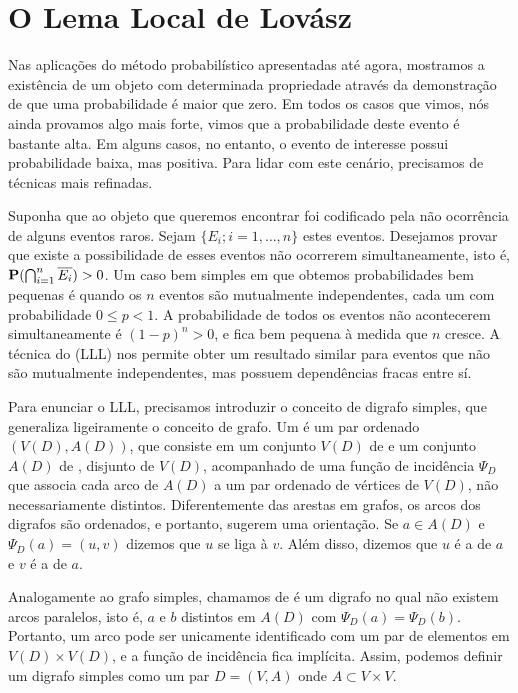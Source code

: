 
\section{O Lema Local de Lovász}


Nas aplicações do método probabilístico apresentadas até agora, mostramos a existência de um objeto com determinada propriedade através da demonstração de que uma probabilidade é maior que zero. Em todos os casos que vimos, nós ainda provamos algo mais forte, vimos que a probabilidade deste evento é bastante alta. Em alguns casos, no entanto, o evento de interesse possui probabilidade baixa, mas positiva. Para lidar com este cenário, precisamos de técnicas mais refinadas.

Suponha que ao objeto que queremos encontrar foi codificado pela não ocorrência de alguns eventos raros. Sejam $\{E_i; i = 1,\dots,n\}$ estes eventos. Desejamos provar que existe a possibilidade de esses eventos não ocorrerem simultaneamente, isto é,  $\operatorname{\mathbf{P}}(\bigcap_{i=1}^n \overline{E_i}) > 0$. Um caso bem simples em que obtemos probabilidades bem pequenas é quando os $n$ eventos são mutualmente independentes, cada um com probabilidade $0 \leq p<1$. A probabilidade de todos os eventos não acontecerem simultaneamente é $(1-p)^n > 0$, e fica bem pequena à medida que $n$ cresce. A técnica do  (LLL) nos permite obter um resultado similar para eventos que não são mutualmente independentes, mas possuem dependências fracas entre sí.

Para enunciar o LLL, precisamos introduzir o conceito de digrafo simples, que generaliza ligeiramente o conceito de grafo. Um  é um par ordenado $(V(D), A(D))$, que consiste em um conjunto $V(D)$ de  e um conjunto $A(D)$ de , disjunto de $V(D)$, acompanhado de uma função de incidência $\Psi_D$ que associa cada arco de $A(D)$ a um par ordenado de vértices de $V(D)$, não necessariamente distintos. Diferentemente das arestas em grafos, os arcos dos digrafos são ordenados, e portanto, sugerem uma orientação. Se $a \in A(D)$ e $\Psi_D(a) = (u,v)$ dizemos que $u$ se liga à $v$. Além disso, dizemos que $u$ é a  de $a$ e $v$ é a  de $a$.

Analogamente ao grafo simples, chamamos de  é um digrafo no qual não existem arcos paralelos, isto é, $a$ e $b$ distintos em $A(D)$ com $\Psi_D(a) = \Psi_D(b)$. Portanto, um arco pode ser unicamente identificado com um par de elementos em $V(D) \times V(D)$, e a função de incidência fica implícita. Assim, podemos definir um digrafo simples como um par $D = (V,A)$ onde $A \subset V\times V$.

